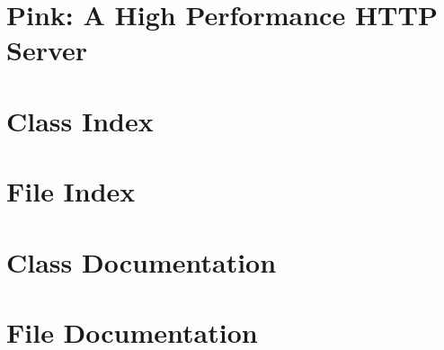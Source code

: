 \documentclass[twoside]{book}
\newcommand{\+}{\discretionary{\mbox{\scriptsize$\hookleftarrow$}}{}{}}
\newcommand{\clearemptydoublepage}{%
  \newpage{\pagestyle{empty}\cleardoublepage}%
}
\begin{document}
\chapter{Pink\+: A High Performance H\+T\+TP Server}
\label{md__r_e_a_d_m_e}

\chapter{Class Index}

\chapter{File Index}

\chapter{Class Documentation}










\chapter{File Documentation}



























\backmatter
\newpage
{}
\clearemptydoublepage
{}
\printindex
\end{document}
